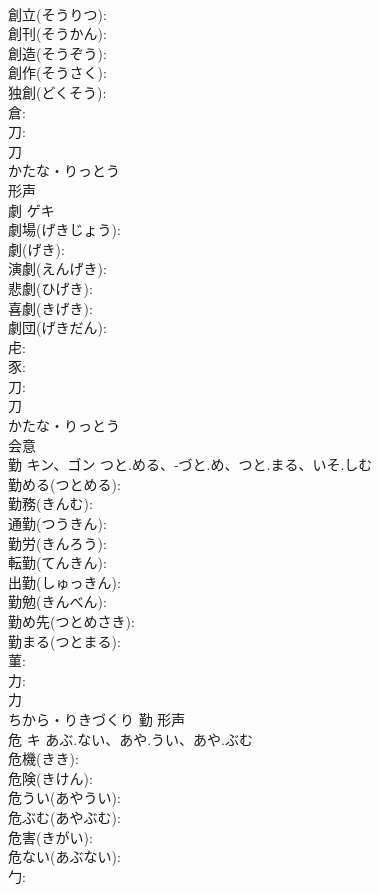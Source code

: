 \documentclass[8pt]{extreport}
\begin{document}
\begin{CJK}{UTF8}{min}
\\	創立(そうりつ): 
\\	創刊(そうかん): 
\\	創造(そうぞう): 
\\	創作(そうさく): 
\\	独創(どくそう): 
\\	倉: 
\\	刀: 
\\	刀	
\\	かたな・りっとう	
\\	形声 
\\	劇	ゲキ			
\\	劇場(げきじょう): 
\\	劇(げき): 
\\	演劇(えんげき): 
\\	悲劇(ひげき): 
\\	喜劇(きげき): 
\\	劇団(げきだん): 
\\	虍: 
\\	豕: 
\\	刀: 
\\	刀	
\\	かたな・りっとう	
\\	会意 
\\	勤	キン、ゴン	つと.める、-づと.め、つと.まる、いそ.しむ		
\\	勤める(つとめる): 
\\	勤務(きんむ): 
\\	通勤(つうきん): 
\\	勤労(きんろう): 
\\	転勤(てんきん): 
\\	出勤(しゅっきん): 
\\	勤勉(きんべん): 
\\	勤め先(つとめさき): 
\\	勤まる(つとまる): 
\\	菫: 
\\	力: 
\\	力	
\\	ちから・りきづくり	勤	形声 
\\	危	キ	あぶ.ない、あや.うい、あや.ぶむ		
\\	危機(きき): 
\\	危険(きけん): 
\\	危うい(あやうい): 
\\	危ぶむ(あやぶむ): 
\\	危害(きがい): 
\\	危ない(あぶない): 
\\	勹: 

\end{CJK}
\end{document}
